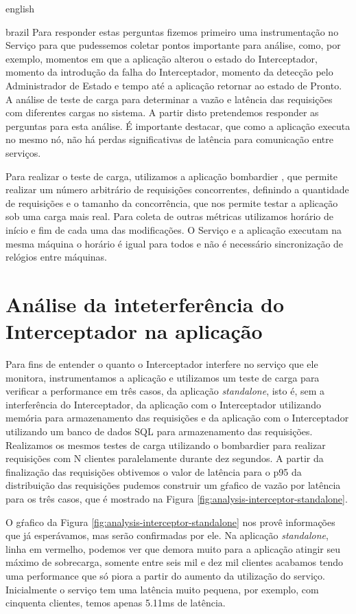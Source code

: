 \begin{otherlanguage*}{english}
\begin{otherlanguage*}{brazil}
Para responder estas perguntas fizemos primeiro uma instrumentação no Serviço para que
pudessemos coletar pontos importante para análise, como, por exemplo, momentos em que a
aplicação alterou o estado do Interceptador, momento da introdução da falha do Interceptador,
momento da detecção pelo Administrador de Estado e tempo até a aplicação retornar ao estado
de Pronto. A análise de teste de carga para determinar a vazão e latência das requisições com
diferentes cargas no sistema. A partir disto pretendemos responder as perguntas para esta
análise. É importante destacar, que como a aplicação executa no mesmo nó, não há perdas
significativas de latência para comunicação entre serviços.

Para realizar o teste de carga, utilizamos a aplicação bombardier \cite{bombardier}, que
permite realizar um número arbitrário de requisições concorrentes, definindo a quantidade
de requisições e o tamanho da concorrência, que nos permite testar a aplicação sob uma
carga mais real. Para coleta de outras métricas utilizamos horário de início e fim de cada
uma das modificações. O Serviço e a aplicação executam na mesma máquina o horário é
igual para todos e não é necessário sincronização de relógios entre máquinas.

\section{Análise da inteterferência do Interceptador na aplicação}

Para fins de entender o quanto o Interceptador interfere no serviço que ele monitora,
instrumentamos a aplicação e utilizamos um teste de carga para verificar a performance
em três casos, da aplicação \textit{standalone}, isto é, sem a interferência do Interceptador,
da aplicação com o Interceptador utilizando memória para armazenamento das requisições e 
da aplicação com o Interceptador utilizando um banco de dados SQL para armazenamento das
requisições. Realizamos os mesmos testes de carga utilizando o bombardier para realizar
requisições com N clientes paralelamente durante dez segundos. A partir da finalização
das requisições obtivemos o valor de latência para o p95 da distribuição das requisições 
 pudemos construir um gŕafico de vazão por latência para os três casos, que é mostrado na Figura
\ref{fig:analysis-interceptor-standalone}.

O gŕafico da Figura \ref{fig:analysis-interceptor-standalone} nos provê informações que já
esperávamos, mas serão confirmadas por ele. Na aplicação \textit{standalone}, linha em vermelho,
podemos ver que demora muito para a aplicação atingir seu máximo de sobrecarga, somente entre
seis mil e dez mil clientes acabamos tendo uma performance que só piora a partir do aumento
da utilização do serviço. Inicialmente o serviço tem uma latência muito pequena, por exemplo,
com cinquenta clientes, temos apenas 5.11ms de latência.


\end{otherlanguage*}
\end{otherlanguage*}

